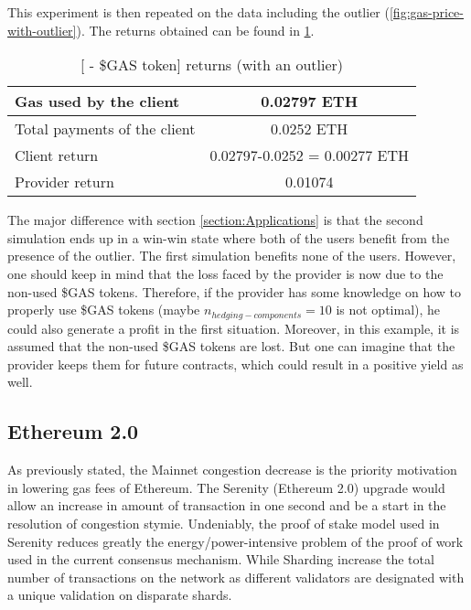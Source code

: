     This experiment is then repeated on the data including the outlier (\ref{fig:gas-price-with-outlier}). The returns obtained can  be found in \ref{tab:variables:application-5}.
    
    \begin{table}[htbp]
    \caption{[{\projectName} - \$GAS token] returns  (with an outlier) }
    \begin{center}
    \begin{tabular}{|l|c|}
    \hline
    Gas used by the client & 0.02797 ETH \\
    \hline
    Total payments of the client & 0.0252 ETH \\
    \hline
    Client return &  0.02797-0.0252 = 0.00277 ETH \\
    \hline
    Provider return &  0.01074 \\
    \hline
    \end{tabular}
    \label{tab:variables:application-5}
    \end{center}
    \end{table}
    
    The major difference with section \ref{section:Applications} is that the second simulation ends up in a win-win state where both of the users benefit from the presence of the outlier. The first simulation benefits none of the users. However, one should keep in mind that the loss faced by the provider is now due to the non-used \$GAS tokens. Therefore, if the provider has some knowledge on how to properly use \$GAS tokens (maybe $n_{hedging-components}=10$ is not optimal), he could also generate a profit in the first situation. Moreover, in this example, it is assumed that the non-used \$GAS tokens are lost. But one can imagine that the provider keeps them for future contracts, which could result in a positive yield as well.


 \subsection{Ethereum 2.0}
    
    As previously stated, the Mainnet congestion decrease is the priority motivation in lowering gas fees of Ethereum. The Serenity (Ethereum 2.0) upgrade would allow an increase in amount of transaction in one second and be a start in the resolution of congestion stymie. Undeniably, the proof of stake model used in Serenity reduces greatly the energy/power-intensive problem of the proof of work used in the current consensus mechanism. While Sharding increase the total number of transactions on the network as different validators are designated with a unique validation on disparate shards.
    
